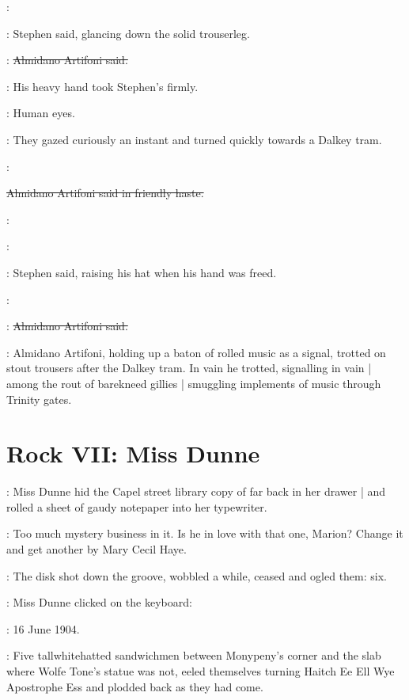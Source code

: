 \Stephen:

:
Stephen said,
glancing down the solid trouserleg.

\artifoni:
\sout{Almidano Artifoni said.}

:
His heavy hand took Stephen's firmly.

\StephenInt:
Human eyes.

:
They gazed curiously an instant
and turned quickly towards a Dalkey tram.

\artifoni:

\sout{Almidano Artifoni said in friendly haste.}

\artifoni:

\Stephen:

:
Stephen said,
raising his hat when his hand was freed.

\Stephen:

\artifoni:
\sout{Almidano Artifoni said.}

:
Almidano Artifoni,
holding up a baton of rolled music as a signal,
trotted on stout trousers after the Dalkey tram.
In vain he trotted,
signalling in vain |
among the rout of barekneed gillies |
smuggling implements of music through Trinity gates.


\section*{Rock VII: Miss Dunne}


:
Miss Dunne hid the Capel street library copy
of  far back in her drawer |
and rolled a sheet of gaudy notepaper into her typewriter.%

\dunneint:
Too much mystery business in it.
Is he in love with that one, Marion?
Change it and get another by Mary Cecil Haye.
 
\begin{interject}
    :
    The disk shot down the groove,
    wobbled a while,
    ceased and ogled them: six.
\end{interject}

:
Miss Dunne clicked on the keyboard:

\missdunne:
16 June 1904.

\begin{interject}
    :
    Five tall\-white\-hatted sandwichmen
    between Monypeny's corner and the slab where Wolfe Tone's statue was not,
    eeled themselves turning
    Haitch Ee Ell Wye Apostrophe Ess \stage{[H.E.L.Y.'S]}
    and plodded back as they had come.
\end{interject}

